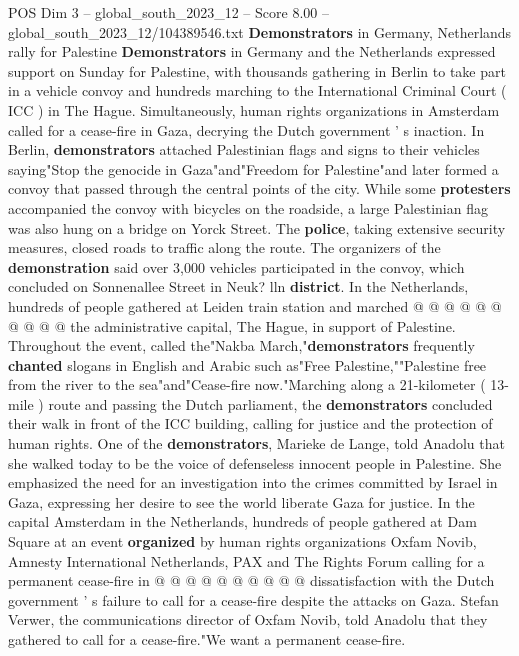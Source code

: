 \begin{textsample}{POS Dim 3 – global\_south\_2023\_12 – Score 8.00 – global\_south\_2023\_12/104389546.txt}  \label{ex:f3_pos_441}
\textbf{Demonstrators} in Germany, Netherlands rally for Palestine \textbf{Demonstrators} in Germany and the Netherlands expressed support on Sunday for Palestine, with thousands gathering in Berlin to take part in a vehicle convoy and hundreds marching to the International Criminal Court ( ICC ) in The Hague.
Simultaneously, human rights organizations in Amsterdam called for a cease-fire in Gaza, decrying the Dutch government ' s inaction.
In Berlin, \textbf{demonstrators} attached Palestinian flags and signs to their vehicles saying"Stop the genocide in Gaza"and"Freedom for Palestine"and later formed a convoy that passed through the central points of the city.
While some \textbf{protesters} accompanied the convoy with bicycles on the roadside, a large Palestinian flag was also hung on a bridge on Yorck Street.
The \textbf{police}, taking extensive security measures, closed roads to traffic along the route.
The organizers of the \textbf{demonstration} said over 3,000 vehicles participated in the convoy, which concluded on Sonnenallee Street in Neuk? lln \textbf{district}.
In the Netherlands, hundreds of people gathered at Leiden train station and marched @ @ @ @ @ @ @ @ @ @ the administrative capital, The Hague, in support of Palestine.
Throughout the event, called the"Nakba March,"\textbf{demonstrators} frequently \textbf{chanted} slogans in English and Arabic such as"Free Palestine,""Palestine free from the river to the sea"and"Cease-fire now."Marching along a 21-kilometer ( 13-mile ) route and passing the Dutch parliament, the \textbf{demonstrators} concluded their walk in front of the ICC building, calling for justice and the protection of human rights.
One of the \textbf{demonstrators}, Marieke de Lange, told Anadolu that she walked today to be the voice of defenseless innocent people in Palestine.
She emphasized the need for an investigation into the crimes committed by Israel in Gaza, expressing her desire to see the world liberate Gaza for justice.
In the capital Amsterdam in the Netherlands, hundreds of people gathered at Dam Square at an event \textbf{organized} by human rights organizations Oxfam Novib, Amnesty International Netherlands, PAX and The Rights Forum calling for a permanent cease-fire in @ @ @ @ @ @ @ @ @ @ dissatisfaction with the Dutch government ' s failure to call for a cease-fire despite the attacks on Gaza.
Stefan Verwer, the communications director of Oxfam Novib, told Anadolu that they gathered to call for a cease-fire."We want a permanent cease-fire.

\end{textsample}
